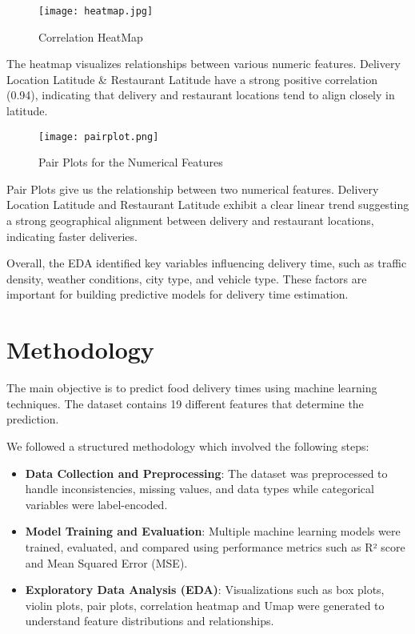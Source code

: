 \documentclass[10pt,twocolumn,letterpaper]{article}
\begin{document}
        \begin{figure}[ht]
            \centering
            \texttt{[image: heatmap.jpg]}
            \caption{Correlation HeatMap}
            \label{fig:heatmap}
        \end{figure}

        The heatmap visualizes relationships between various numeric features. Delivery Location Latitude \& Restaurant Latitude have a strong positive correlation (0.94), indicating that delivery and restaurant locations tend to align closely in latitude.

        \begin{figure}[ht]
            \centering
            \texttt{[image: pairplot.png]}
            \caption{Pair Plots for the Numerical Features}
            \label{fig:pairplot}
        \end{figure}

        Pair Plots give us the relationship between two numerical features. Delivery Location Latitude and Restaurant Latitude exhibit a clear linear trend suggesting a strong geographical alignment between delivery and restaurant locations, indicating faster deliveries.

        Overall, the EDA identified key variables influencing delivery time, such as traffic density, weather conditions, city type, and vehicle type. These factors are important for building predictive models for delivery time estimation.

\section{Methodology}
    The main objective is to predict food delivery times using machine learning techniques. The dataset contains 19 different features that determine the prediction.

    We followed a structured methodology which involved the following steps:
    \begin{itemize}
        \item \textbf{Data Collection and Preprocessing}: The dataset was preprocessed to handle inconsistencies, missing values, and data types while categorical variables were label-encoded.
        \item \textbf{Model Training and Evaluation}: Multiple machine learning models were trained, evaluated, and compared using performance metrics such as R² score and Mean Squared Error (MSE).
        \item \textbf{Exploratory Data Analysis (EDA)}: Visualizations such as box plots, violin plots, pair plots, correlation heatmap and Umap were generated to understand feature distributions and relationships.
    \end{itemize}
\end{document}
